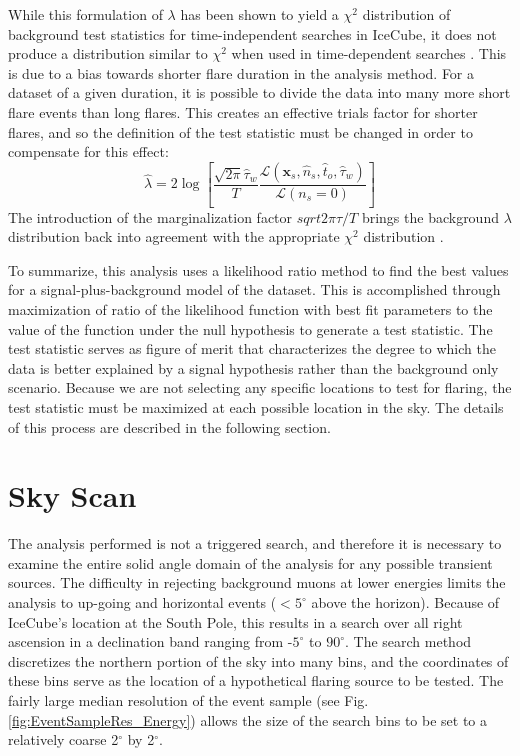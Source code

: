 \documentclass{gatech-thesis}
\begin{document}
While this formulation of $\lambda$ has been shown to yield a $\chi^2$ distribution of background test statistics for time-independent searches in IceCube, it does not produce a distribution similar to $\chi^2$ when used in time-dependent searches \cite{2012ApJ...744....1A}. This is due to a bias towards shorter flare duration in the analysis method. For a dataset of a given duration, it is possible to divide the data into many more short flare events than long flares. This creates an effective trials factor for shorter flares, and so the definition of the test statistic must be changed in order to compensate for this effect:
\begin{equation}
\hat{\lambda} = 2\log \left[\frac{\sqrt{2\pi}\hat{\tau}_w}{T}\frac{\mathcal{L}(\mathbf{x}_s,\hat{n}_s,\hat{t}_o,\hat{\tau}_w)}{\mathcal{L}(n_s = 0)} \right]
\end{equation}
The introduction of the marginalization factor $sqrt{2\pi}\tau /T$ brings the background $\lambda$ distribution back into agreement with the appropriate $\chi^2$ distribution \cite{2012ApJ...744....1A}.

To summarize, this analysis uses a likelihood ratio method to find the best values for a signal-plus-background model of the dataset. This is accomplished through maximization of ratio of the likelihood function with best fit parameters to the value of the function under the null hypothesis to generate a test statistic. The test statistic serves as figure of merit that characterizes the degree to which the data is better explained by a signal hypothesis rather than the background only scenario. Because we are not selecting any specific locations to test for flaring, the test statistic must be maximized at each possible location in the sky. The details of this process are described in the following section.
\section{Sky Scan}

The analysis performed is not a triggered search, and therefore it is necessary to examine the entire solid angle domain of the analysis for any possible transient sources. The difficulty in rejecting background muons at lower energies limits the analysis to up-going and horizontal events ($< 5^{\circ}$ above the horizon). Because of IceCube's location at the South Pole, this results in a search over all right ascension in a declination band ranging from -$5^{\circ}$ to $90^{\circ}$. The search method discretizes the northern portion of the sky into many bins, and the coordinates of these bins serve as the location of a hypothetical flaring source to be tested. The fairly large median resolution of the event sample (see Fig. \ref{fig:EventSampleRes_Energy}) allows the size of the search bins to be set to a relatively coarse 2$^{\circ}$ by 2$^{\circ}$. 
\end{document}
